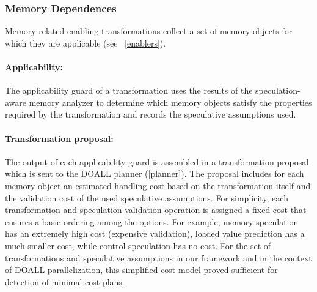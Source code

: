 
\subsubsection{Memory Dependences}

Memory-related enabling transformations collect a set of memory objects
for which they are applicable (see ~\cref{enablers}).

\paragraph{Applicability:}
%
The applicability guard of a transformation uses the results of the
speculation-aware memory analyzer to determine which memory objects
satisfy the properties required by the transformation and records the
speculative assumptions used.
%

\paragraph{Transformation proposal:} The output of each applicability
guard is assembled in a transformation proposal which is sent to the
DOALL planner (\cref{planner}).
%
The proposal includes for each memory object an estimated handling
cost based on the transformation itself and the validation cost of the
used speculative assumptions.
%
%
For simplicity, each transformation and speculation
validation operation is assigned a fixed
cost that ensures a basic ordering among the options. For
example,
memory speculation has an extremely high cost (expensive validation),
loaded value prediction has a much smaller cost, while
control speculation has no cost.
%
%
For the set of transformations and speculative assumptions in our
framework and in the context of DOALL parallelization, this simplified
cost model proved sufficient for detection of minimal cost plans.

